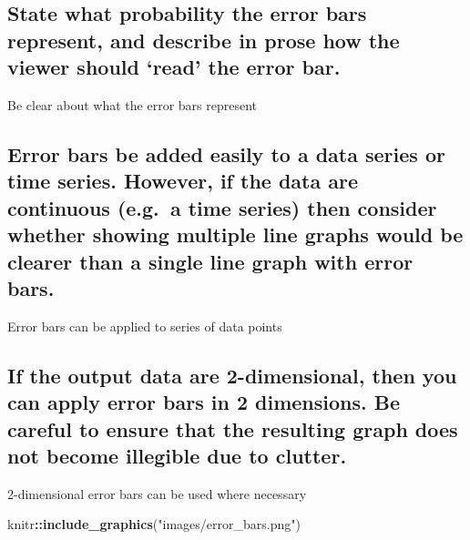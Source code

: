 \documentclass[]{book}
\newenvironment{Shaded}{\begin{snugshade}}{\end{snugshade}}
\newcommand{\KeywordTok}[1]{\textcolor[rgb]{0.13,0.29,0.53}{\textbf{#1}}}
\newcommand{\StringTok}[1]{\textcolor[rgb]{0.31,0.60,0.02}{#1}}
\newcommand{\OperatorTok}[1]{\textcolor[rgb]{0.81,0.36,0.00}{\textbf{#1}}}
\newcommand{\NormalTok}[1]{#1}
\begin{document}
\subsection{\texorpdfstring{State what probability the error bars
represent, and describe in prose how the viewer should `read' the error
bar.}{State what probability the error bars represent, and describe in prose how the viewer should read the error bar.}}\label{state-what-probability-the-error-bars-represent-and-describe-in-prose-how-the-viewer-should-read-the-error-bar.}

 Be clear about what the error bars represent

\subsection{Error bars be added easily to a data series or time series.
However, if the data are continuous (e.g.~a time series) then consider
whether showing multiple line graphs would be clearer than a single line
graph with error
bars.}\label{error-bars-be-added-easily-to-a-data-series-or-time-series.-however-if-the-data-are-continuous-e.g.a-time-series-then-consider-whether-showing-multiple-line-graphs-would-be-clearer-than-a-single-line-graph-with-error-bars.}

 Error bars can be applied to series of data points

\subsection{If the output data are 2-dimensional, then you can apply
error bars in 2 dimensions. Be careful to ensure that the resulting
graph does not become illegible due to
clutter.}\label{if-the-output-data-are-2-dimensional-then-you-can-apply-error-bars-in-2-dimensions.-be-careful-to-ensure-that-the-resulting-graph-does-not-become-illegible-due-to-clutter.}

 2-dimensional error bars can be used where necessary

\begin{Shaded}
\begin{Highlighting}[]
\NormalTok{knitr}\OperatorTok{::}\KeywordTok{include_graphics}\NormalTok{(}\StringTok{"images/error_bars.png"}\NormalTok{)}
\end{Highlighting}
\end{Shaded}
\end{document}
